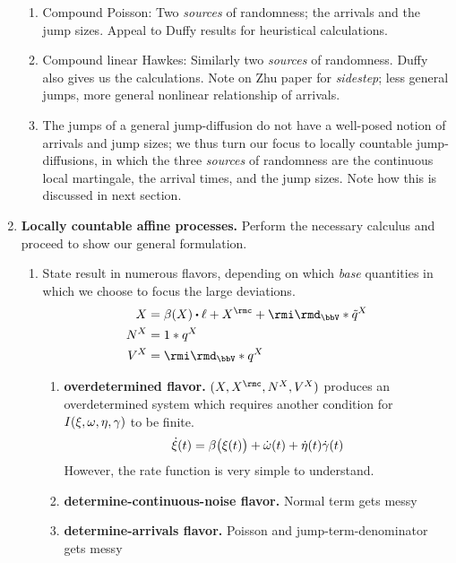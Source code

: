 \begin{enumerate}
\begin{enumerate}
      \item
        Compound Poisson: Two \emph{sources} of randomness; the arrivals and the jump sizes. Appeal to Duffy results for heuristical calculations.
      \item
        Compound linear Hawkes: Similarly two \emph{sources} of randomness. Duffy also gives us the calculations.
        Note on Zhu paper for \emph{sidestep}; less general jumps, more general nonlinear relationship of arrivals.
      \item
        The jumps of a general jump-diffusion do not have a well-posed notion of arrivals and jump sizes; we thus turn our focus to locally countable jump-diffusions, in which the three \emph{sources} of randomness are the continuous local martingale, the arrival times, and the jump sizes.
        Note how this is discussed in next section.
    \end{enumerate}
  \item
    {\bfseries Locally countable affine processes.}
    Perform the necessary calculus and proceed to show our general formulation.
    \begin{enumerate}
      \item
        State result in numerous flavors, depending on which \emph{base} quantities in which we choose to focus the large deviations.
        \begin{align*}
          \X &= \affDrift(\X)\shortInt \leb + \X^\rmc + \id_\vecSpace \ast \compensate{\jumpMeas^\X} \\
          \N^\X &= 1 \ast \jumpMeas^\X \\
          V^\X &= \id_\vecSpace \ast \jumpMeas^\X 
        \end{align*}
        \begin{enumerate}
          \item
            \textbf{overdetermined flavor.}
            $(\X, \X^\rmc, \N^\X, V^\X)$ produces an overdetermined system which requires another condition for $I(\xi, \omega, \eta, \gamma)$ to be finite.
            \[
              \dot{\xi}(t) = \beta\big(\xi(t)\big) + \dot\omega(t) + \dot\eta(t)\dot\gamma(t)
            \]
            However, the rate function is very simple to understand.
          \item
            \textbf{determine-continuous-noise flavor.}
            Normal term gets messy
          \item
            \textbf{determine-arrivals flavor.}
            Poisson and jump-term-denominator gets messy

\end{enumerate}
\end{enumerate}
\end{enumerate}
